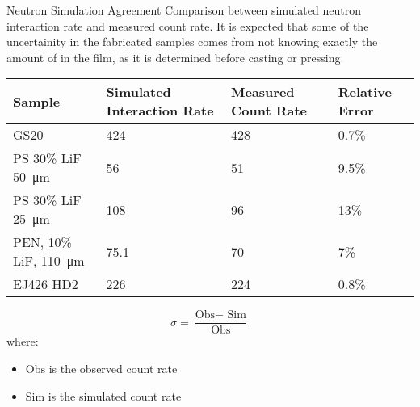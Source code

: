 \begin{frame}{Neutron Simulation Agreement}
	Comparison between simulated neutron interaction rate and measured count rate. It is expected that some of the uncertainity in the fabricated samples comes from not knowing exactly the amount of  in the film, as it is determined before casting or pressing.
  \small
\begin{table}
	\centering
	\label{tab:MCNPXVal}
	\begin{tabular}{m{3cm} | p{2cm} p{2cm} p{1cm}}
		\toprule
			Sample & Simulated Interaction Rate & Measured Count Rate & Relative Error \\
		\midrule
			GS20 & 424  & 428 & 0.7\%  \\ 
			PS 30\% LiF \SI{50}{\um} &  56 & 51 & 9.5\% \\
			PS 30\% LiF \SI{25}{\um} & 108 & 96 &13\%  \\
			PEN, 10\% LiF, \SI{110}{\um} & 75.1 & 70 & 7\% \\
			EJ426 HD2 & 226 & 224 & 0.8\% \\
		\bottomrule
	\end{tabular}
\end{table}
	\tiny
	\begin{definition}
		$$\sigma = \frac{\text{Obs} -\text{ Sim}}{\text{Obs}}$$
	where:
	\begin{itemize}
		\item $\text{Obs}$ is the observed count rate
		\item $\text{Sim}$ is the simulated count rate
	\end{itemize}
	\end{definition}
\hyperlink{MCNPXMain}{}
\hyperlink{toc}{}
\end{frame}
